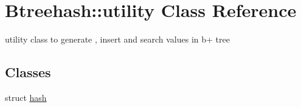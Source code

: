 \hypertarget{class_btreehash_1_1utility}{\section{Btreehash\-:\-:utility Class Reference}
\label{class_btreehash_1_1utility}
}


utility class to generate , insert and search values in b+ tree  


\subsection*{Classes}
\begin{DoxyCompactItemize}
\item 
struct \hyperlink{struct_btreehash_1_1utility_1_1hash}{hash}
\end{DoxyCompactItemize}
